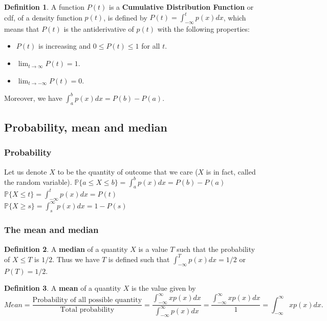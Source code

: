 \documentclass[12pt]{article}
\theoremstyle{definition}
\theoremstyle{definition}
\newtheorem{definition}{Definition}[section]
\theoremstyle{remark}
\theoremstyle{definition}
\theoremstyle{definition}
\theoremstyle{definition}
\begin{document}
\begin{definition}
A function $P(t)$ is a \textbf{Cumulative Distribution Function} or cdf, of a density function $p(t)$, is defined by 
$P(t) =\int_{-\infty}^t p(x) dx $,
which means that $P(t)$ is the antiderivative of $p(t)$ with the following properties:
\begin{itemize}
\item $P(t)$ is increasing and $0\leq P(t)\leq 1$ for all $t$.
\item $\lim_{t \to \infty}P(t)=1.$
\item $\lim_{t \to -\infty}P(t)=0.$
\end{itemize}
\end{definition}

Moreover, we have $\int_a^b p(x)dx=P(b)-P(a)$.

\subsection{Probability, mean and median}

\subsubsection*{Probability}
Let us denote $X$ to be the quantity of outcome that we care ($X$ is in fact, called the random variable).
$\mathbb{P}\{a\leq X\leq b\}=\int_a^b p(x)dx=P(b)-P(a)$\\
$\mathbb{P}\{X\leq t\}=\int_{-\infty}^t p(x)dx=P(t)$\\
$\mathbb{P}\{X\geq s\}=\int_{s}^\infty p(x)dx=1-P(s)$

\subsubsection*{The mean and median}
\begin{definition}
A \textbf{median} of a quantity $X$ is a value $T$ such that the probability of $X\leq T$ is $1/2$. Thus we have  $T$ is defined such that
$\int_{-\infty}^T p(x) dx=1/2$  or $P(T)=1/2$.
\end{definition}
\begin{definition} A \textbf{mean} of a quantity $X$ is the value given by
	\[ Mean= \frac{\text{Probability of all possible quantity}}{\text{Total probability}}= \frac{\int_{-\infty}^{\infty}xp(x)dx}{\int_{-\infty}^{\infty}p(x)dx}=\frac{\int_{-\infty}^{\infty}xp(x)dx}{1}=\int_{-\infty}^{\infty}xp(x)dx. \]
\end{definition}
\end{document}
